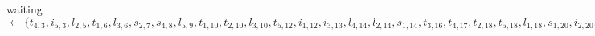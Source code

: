 
\smallbreak
waiting $\leftarrow \{ t_{4,3}, i_{5,3}, l_{2,5}, t_{1,6}, l_{3,6}, s_{2,7}, s_{4,8}, l_{5,9}, t_{1,10}, t_{2,10}, l_{3,10}, t_{5,12}, i_{1,12}, i_{3,13}, l_{4,14}, l_{2,14}, s_{1,14}, t_{3,16}, t_{4,17}, t_{2,18}, t_{5,18}, l_{1,18}, s_{1,20}, i_{2,20}, i_{5,20}, t_{3,20}, l_{4,20} \}$